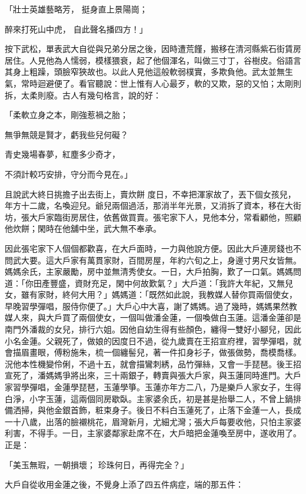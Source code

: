 \begin{showcontents}{}
「壯士英雄藝略芳，  挺身直上景陽崗；

醉來打死山中虎，  自此聲名播四方！」

按下武松，單表武大自從與兄弟分居之後，因時遭荒饉，搬移在清河縣紫石街賃房居住。人見他為人懦弱，模樣猥衰，起了他個渾名，叫做三寸丁，谷樹皮。俗語言其身上粗躁，頭臉窄狹故也。以此人見他這般軟弱樸實，多欺負他。武太並無生氣，常時迴避便了。看官聽說：世上惟有人心最歹，軟的又欺，惡的又怕；太剛則拆，太柔則廢。古人有幾句格言，說的好：

「柔軟立身之本，剛強惹禍之胎；

無爭無競是賢才，虧我些兒何礙？

青史幾場春夢，紅塵多少奇才，

不須計較巧安排，守分而今見在。」

且說武大終日挑擔子出去街上，賣炊餅 度日，不幸把渾家故了，丟下個女孩兒，年方十二歲，名喚迎兒。爺兒兩個過活，那消半年光景，又消拆了資本，移在大街坊，張大戶家臨街房居住，依舊做買賣。張宅家下人，見他本分，常看顧他，照顧他炊餅；閑時在他舖中坐，武大無不奉承。

因此張宅家下人個個都歡喜，在大戶面時，一力與他說方便。因此大戶連房錢也不問武大要。這大戶家有萬貫家財，百間房屋，年約六旬之上，身邊寸男尺女皆無。媽媽余氏，主家嚴勵，房中並無清秀使女。一日，大戶拍胸，歎了一口氣。媽媽問道：「你田產豐盛，資財充足，閑中何故歎氣？」大戶道：「我許大年紀，又無兒女，雖有家財，終何大用？」媽媽道：「既然如此說，我教媒人替你買兩個使女，早晚習學彈唱，服侍你便了。」大戶心中大喜，謝了媽媽。過了幾時，媽媽果然教媒人來，與大戶買了兩個使女，一個叫做潘金蓮，一個喚做白玉蓮。這潘金蓮卻是南門外潘裁的女兒，排行六姐。因他自幼生得有些顏色，纏得一雙好小腳兒，因此小名金蓮。父親死了，做娘的因度日不過，從九歲賣在王招宣府裡，習學彈唱，就會描眉畫眼，傅粉施朱，梳一個纏髻兒，著一件扣身衫子，做張做勢，喬模喬樣。況他本性機變伶俐，不過十五，就會描鸞刺綉，品竹彈絲，又會一手琵琶。後王招宣死了，潘媽媽爭將出來，三十兩銀子，轉賣與張大戶家，與玉蓮同時進門。大戶家習學彈唱，金蓮學琵琶，玉蓮學箏。玉蓮亦年方二八，乃是樂戶人家女子，生得白淨，小字玉蓮，這兩個同房歇臥。主家婆余氏，初是甚是抬舉二人，不曾上鍋排備洒掃，與他金銀首飾，粧束身子。後日不料白玉蓮死了，止落下金蓮一人，長成一十八歲，出落的臉襯桃花，眉灣新月，尤細尤灣；張大戶每要收他，只怕主家婆利害，不得手。一日，主家婆鄰家赴席不在，大戶暗把金蓮喚至房中，遂收用了。正是：

「美玉無瑕，一朝損壞；  珍珠何日，再得完全？」

大戶自從收用金蓮之後，不覺身上添了四五件病症，端的那五件：


\end{showcontents}
